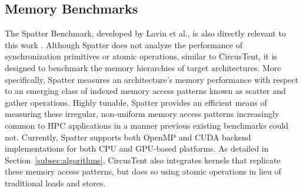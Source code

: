 \subsection{Memory Benchmarks}
\label{subsec:memory_bench}

The Spatter Benchmark, developed by Lavin et al., is also directly relevant to this work \cite{lavin2018spatter}.
Although Spatter does not analyze the performance of synchronization primitives or atomic operations, similar to CircusTent, it is designed to benchmark the memory hierarchies of target architectures.
More specifically, Spatter measures an architecture's memory performance with respect to an emerging class of indexed memory access patterns known as scatter and gather operations.
Highly tunable, Spatter provides an efficient means of measuring these irregular, non-uniform memory access patterns increasingly common to HPC applications in a manner previous existing benchmarks could not.
Currently, Spatter supports both OpenMP and CUDA backend implementations for both CPU and GPU-based platforms.
As detailed in Section~\ref{subsec:algorithms}, CircusTent also integrates kernels that replicate these memory access patterns, but does so using atomic operations in lieu of traditional loads and stores.


